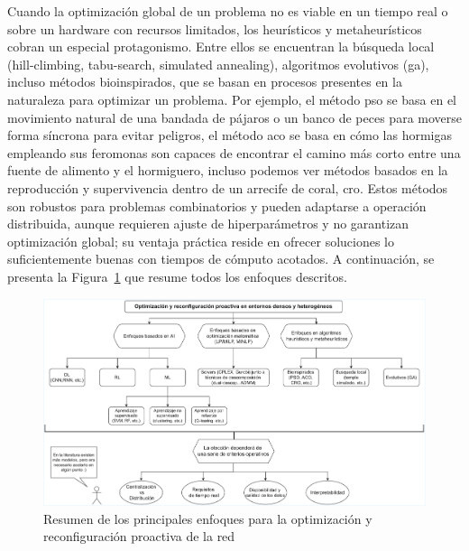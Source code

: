 Cuando la optimización global de un problema no es viable en un tiempo real o sobre un hardware con recursos limitados, los heurísticos y metaheurísticos cobran un especial protagonismo. Entre ellos se encuentran la búsqueda local~\cite{lourencco2003iterated} (hill-climbing, tabu-search, simulated annealing), algoritmos evolutivos (\gls{ga}), incluso métodos bioinspirados, que se basan en procesos presentes en la naturaleza para optimizar un problema. Por ejemplo, el método \gls{pso} se basa en el movimiento natural de una bandada de pájaros o un banco de peces para moverse forma síncrona para evitar peligros, el método \gls{aco} se basa en cómo las hormigas empleando sus feromonas son capaces de encontrar el camino más corto entre una fuente de alimento y el hormiguero, incluso podemos ver métodos basados en la reproducción y supervivencia dentro de un arrecife de coral, \gls{cro}. Estos métodos son robustos para problemas combinatorios y pueden adaptarse a operación distribuida, aunque requieren ajuste de hiperparámetros y no garantizan optimización global; su ventaja práctica reside en ofrecer soluciones lo suficientemente buenas con tiempos de cómputo acotados. A continuación, se presenta la Figura~\ref{fig:sota_10_modelos} que resume todos los enfoques descritos. 



\begin{figure}
   \centering
   \includegraphics[width=\textwidth]{fig/02_sota/sota_10_modelos.drawio.pdf}
   \caption{Resumen de los principales enfoques para la optimización y reconfiguración proactiva de la red}
   \label{fig:sota_10_modelos}
\end{figure}



